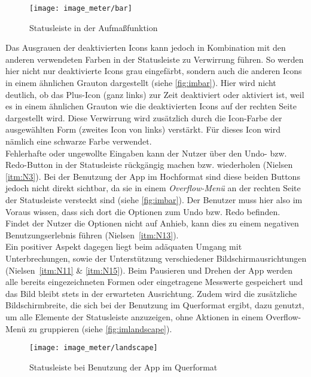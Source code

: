 \begin{wrapfigure}{R}{0.4\textwidth}
  \centering
  \texttt{[image: image\_meter/bar]}
  \caption{Statusleiste in der Aufmaßfunktion}
  \label{fig:imbar}
\end{wrapfigure}

Das Ausgrauen der deaktivierten Icons kann jedoch in Kombination mit den anderen verwendeten Farben in der Statusleiste zu Verwirrung führen.
So werden hier nicht nur deaktivierte Icons grau eingefärbt, sondern auch die anderen Icons in einem ähnlichen Grauton dargestellt (siehe \autoref{fig:imbar}).
Hier wird nicht deutlich, ob das Plus-Icon (ganz links) zur Zeit deaktiviert oder aktiviert ist, weil es in einem ähnlichen Grauton wie die deaktivierten Icons auf der rechten Seite dargestellt wird.
Diese Verwirrung wird zusätzlich durch die Icon-Farbe der ausgewählten Form (zweites Icon von links) verstärkt.
Für dieses Icon wird nämlich eine schwarze Farbe verwendet. \\

Fehlerhafte oder ungewollte Eingaben kann der Nutzer über den Undo- bzw. Redo-Button in der Statusleiste rückgängig machen bzw. wiederholen (Nielsen \autoref{itm:N3}).
Bei der Benutzung der App im Hochformat sind diese beiden Buttons jedoch nicht direkt sichtbar, da sie in einem \emph{Overflow-Menü} an der rechten Seite der Statusleiste versteckt sind (siehe \autoref{fig:imbar}).
Der Benutzer muss hier also im Voraus wissen, dass sich dort die Optionen zum Undo bzw. Redo befinden.
Findet der Nutzer die Optionen nicht auf Anhieb, kann dies zu einem negativen Benutzungserlebnis führen (Nielsen~\autoref{itm:N13}). \\

Ein positiver Aspekt dagegen liegt beim adäquaten Umgang mit Unterbrechungen, sowie der Unterstützung verschiedener Bildschirmausrichtungen (Nielsen~\autoref{itm:N11} \& \autoref{itm:N15}).
Beim Pausieren und Drehen der App werden alle bereits eingezeichneten Formen oder eingetragene Messwerte gespeichert und das Bild bleibt stets in der erwarteten Ausrichtung.
Zudem wird die zusätzliche Bildschirmbreite, die sich bei der Benutzung im Querformat ergibt, dazu genutzt, um alle Elemente der Statusleiste anzuzeigen, ohne Aktionen in einem Overflow-Menü zu gruppieren (siehe \autoref{fig:imlandscape}).

\begin{figure}[h]
  \centering
  \texttt{[image: image\_meter/landscape]}
  \caption{Statusleiste bei Benutzung der App im Querformat}
  \label{fig:imlandscape}
\end{figure}

